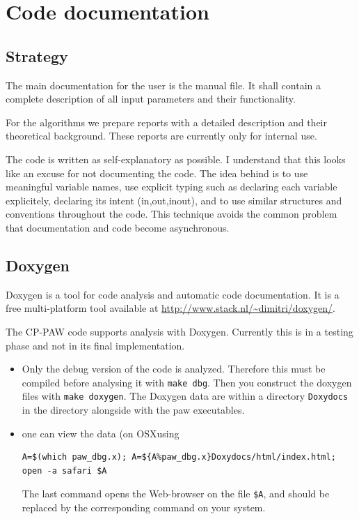 \documentclass[final,12pt]{article}
\begin{document}
{{{{{{\section{Code documentation}
\subsection{Strategy}
The main documentation for the user is the manual file. It shall
contain a complete description of all input parameters and their
functionality.

For the algorithms we prepare reports with a detailed description and
their theoretical background. These reports are currently only for
internal use. 

The code is written as self-explanatory as possible. I understand that
this looks like an excuse for not documenting the code. The idea
behind is to use meaningful variable names, use explicit typing such
as declaring each variable explicitely, declaring its intent
(in,out,inout), and to use similar structures and conventions
throughout the code. This technique avoids the common problem that
documentation and code become asynchronous.

\subsection{Doxygen}
Doxygen is a tool for code analysis and automatic code
documentation. It is a free multi-platform tool available at
\url{http://www.stack.nl/~dimitri/doxygen/}.

The CP-PAW code supports analysis with Doxygen. Currently this is in a
testing phase and not in its final implementation. 
\begin{itemize}
\item Only the debug version of the code is analyzed. Therefore this
  must be compiled before analysing it with \verb|make dbg|. Then you
  construct the doxygen files with \verb|make doxygen|. The Doxygen
  data are within a directory \verb|Doxydocs| in the directory
  alongside with the paw executables.
%
\item one can view the data (on OSXusing
\begin{verbatim}
A=$(which paw_dbg.x); A=${A%paw_dbg.x}Doxydocs/html/index.html; open -a safari $A
\end{verbatim}
The last command opens the Web-browser on the file \verb|$A|, and
should be replaced by the corresponding command on your system.
%
\end{itemize}

}}}}}}
\end{document}
